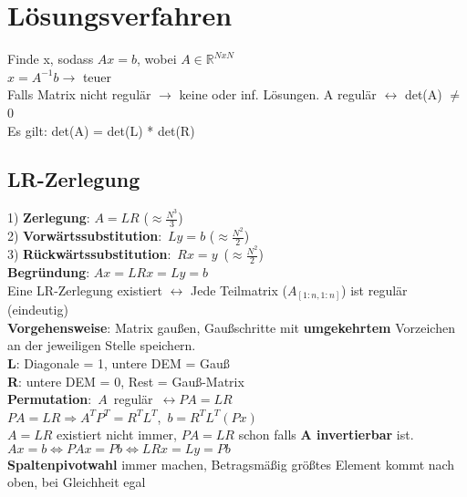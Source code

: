 \section{Lösungsverfahren}
Finde x, sodass $Ax = b$, wobei $A \in \mathbb{R}^{NxN}$\\
$x = A^{-1}b \rightarrow$ teuer\\
Falls Matrix nicht regulär $\rightarrow$ keine oder inf. Lösungen. A regulär $\leftrightarrow$ det(A) $\neq$ 0\\
Es gilt: det(A) = det(L) * det(R)
\subsection{LR-Zerlegung}
1) \textbf{Zerlegung}: $A = LR$ ($\approx \frac{N^3}{3}$)\\
2) \mbox{\textbf{Vorwärtssubstitution}: $Ly = b$} ($\approx \frac{N^2}{2}$)\\
3) \mbox{\textbf{Rückwärtssubstitution}: $Rx = y$ ($\approx \frac{N^2}{2}$)}\\
\textbf{Begründung}: $Ax = LRx = Ly = b$\\
Eine LR-Zerlegung existiert $\leftrightarrow$ Jede Teilmatrix ($A_{[1:n,1:n]}$) ist regulär (eindeutig)\\
\textbf{Vorgehensweise}: Matrix gaußen, Gaußschritte mit \textbf{umgekehrtem} Vorzeichen an der jeweiligen Stelle speichern.\\
\textbf{L}: Diagonale = 1, untere DEM = Gauß\\
\textbf{R}: untere DEM = 0, Rest = Gauß-Matrix\\
\mbox{\textbf{Permutation}: $A$ regulär $\leftrightarrow PA = LR$}\\
\mbox{$PA = LR \Rightarrow A^TP^T = R^TL^T$, $b = R^TL^T(Px)$}\\
$A = LR$ existiert nicht immer, $PA = LR$ schon falls \textbf{A invertierbar} ist.\\
$Ax = b \Leftrightarrow PAx = Pb \Leftrightarrow LRx = Ly = Pb$\\
\textbf{Spaltenpivotwahl} immer machen, Betragsmäßig größtes Element kommt nach oben, bei Gleichheit egal

